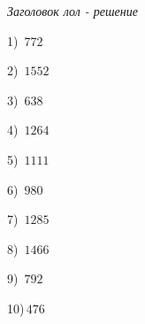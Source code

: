 \documentclass{article}
\begin{document}
 
\begin{center} 
   \large{\textit{Заголовок лол - решение}} 
\end{center}\begin{multicols}{2}
1)$\,\,\,772$ \par 
2)$\,\,\,1552$ \par 
3)$\,\,\,638$ \par 
4)$\,\,\,1264$ \par 
5)$\,\,\,1111$ \par 
6)$\,\,\,980$ \par 
7)$\,\,\,1285$ \par 
8)$\,\,\,1466$ \par 
9)$\,\,\,792$ \par 
10)$\,476$ \par 
\end{multicols} 
\end{document}
